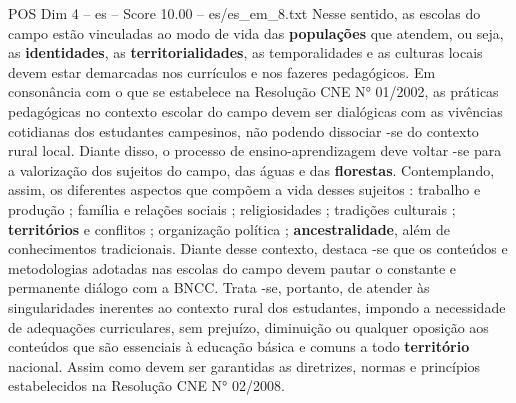 \begin{textsample}{POS Dim 4 – es – Score 10.00 – es/es\_em\_8.txt}
Nesse sentido, as escolas do campo estão vinculadas ao modo de vida das \textbf{populações} que atendem, ou seja, as \textbf{identidades}, as \textbf{territorialidades}, as temporalidades e as culturas locais devem estar demarcadas nos currículos e nos fazeres pedagógicos.
Em consonância com o que se estabelece na Resolução CNE N{\EmojiFont °} 01/2002, as práticas pedagógicas no contexto escolar do campo devem ser dialógicas com as vivências cotidianas dos estudantes campesinos, não podendo dissociar -se do contexto rural local.
Diante disso, o processo de ensino-aprendizagem deve voltar -se para a valorização dos sujeitos do campo, das águas e das \textbf{florestas}.
Contemplando, assim, os diferentes aspectos que compõem a vida desses sujeitos : trabalho e produção ; família e relações sociais ; religiosidades ; tradições culturais ; \textbf{territórios} e conflitos ; organização política ; \textbf{ancestralidade}, além de conhecimentos tradicionais.
Diante desse contexto, destaca -se que os conteúdos e metodologias adotadas nas escolas do campo devem pautar o constante e permanente diálogo com a BNCC.
Trata -se, portanto, de atender às singularidades inerentes ao contexto rural dos estudantes, impondo a necessidade de adequações curriculares, sem prejuízo, diminuição ou qualquer oposição aos conteúdos que são essenciais à educação básica e comuns a todo \textbf{território} nacional.
Assim como devem ser garantidas as diretrizes, normas e princípios estabelecidos na Resolução CNE N{\EmojiFont °} 02/2008.

\end{textsample}
